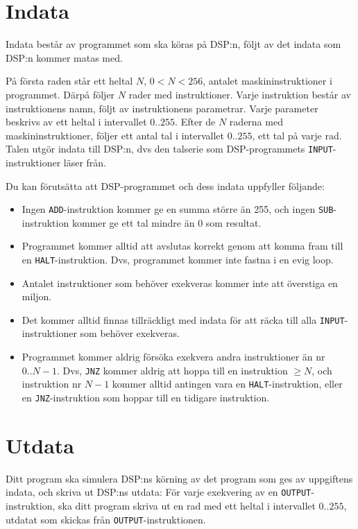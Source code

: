 \section*{Indata}
Indata består av programmet som ska köras på DSP:n, följt av det indata som DSP:n kommer matas med.

På första raden står ett heltal $N$, $0<N<256$, antalet maskininstruktioner i programmet. Därpå följer $N$ rader med instruktioner. Varje instruktion består av instruktionens namn, följt av instruktionens parametrar. Varje parameter beskrivs av ett heltal i intervallet $0..255$. Efter de $N$ raderna med maskininstruktioner, följer ett antal tal i intervallet $0..255$, ett tal på varje rad. Talen utgör indata till DSP:n, dvs den talserie som DSP-programmets \texttt{INPUT}-instruktioner läser från.

Du kan förutsätta att DSP-programmet och dess indata uppfyller följande:
\begin{itemize}
\item Ingen \texttt{ADD}-instruktion kommer ge en summa större än 255, och ingen \texttt{SUB}-instruktion kommer ge ett tal mindre än 0 som resultat.
\item Programmet kommer alltid att avslutas korrekt genom att komma fram till en \texttt{HALT}-instruktion. Dvs, programmet kommer inte fastna i en evig loop.
\item Antalet instruktioner som behöver exekveras kommer inte att överstiga en miljon.
\item Det kommer alltid finnas tillräckligt med indata för att räcka till alla \texttt{INPUT}-instruktioner som behöver exekveras.
\item Programmet kommer aldrig försöka exekvera andra instruktioner än nr $0..N-1$. Dvs, \texttt{JNZ} kommer aldrig att hoppa till en instruktion $\ge N$, och instruktion nr $N-1$ kommer alltid antingen vara en \texttt{HALT}-instruktion, eller en \texttt{JNZ}-instruktion som hoppar till en tidigare instruktion. 
\end{itemize}

\section*{Utdata}
Ditt program ska simulera DSP:ns körning av det program som ges av uppgiftens indata, och skriva ut DSP:ns utdata: För varje exekvering av en \texttt{OUTPUT}-instruktion, ska ditt program skriva ut en rad med ett heltal i intervallet $0..255$, utdatat som skickas från \texttt{OUTPUT}-instruktionen. 

